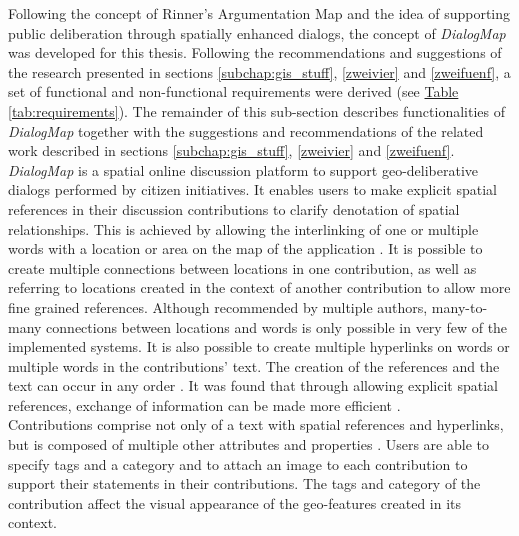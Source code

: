 Following the concept of Rinner's Argumentation Map \cite{Rinner_ArgumentationMaps} and the idea of supporting public deliberation through spatially enhanced dialogs, the concept of \textit{DialogMap} was developed for this thesis. Following the recommendations and suggestions of the research presented in sections \ref{subchap:gis_stuff}, \ref{zweivier} and \ref{zweifuenf}, a set of functional and non-functional requirements were derived (see \hyperref[tab:requirements]{Table \ref{tab:requirements}}). The remainder of this sub-section describes functionalities of \textit{DialogMap} together with the suggestions and recommendations of the related work described in sections \ref{subchap:gis_stuff}, \ref{zweivier} and \ref{zweifuenf}.\\
\textit{DialogMap} is a spatial online discussion platform to support geo-deliberative dialogs \cite{Cai2009_spatial_annotation_deliberation} performed by citizen initiatives. It enables users to make explicit spatial references in their discussion contributions to clarify denotation of spatial relationships. This is achieved by allowing the interlinking of one or multiple words with a location or area on the map of the application \cite{Rinner_ArgumentationMaps}. It is possible to create multiple connections between locations in one contribution, as well as referring to locations created in the context of another contribution to allow more fine grained references. Although recommended by multiple authors, many-to-many connections between locations and words is only possible in very few \cite{Kessler2005_ArgumentationMapPrototype,Voss2004_Evolution_PGIS,you2009_participatory_map_based,Cai2009_spatial_annotation_deliberation} of the implemented systems. It is also possible to create multiple hyperlinks on words or multiple words in the contributions' text. The creation of the references and the text can occur in any order \cite{Voss2004_Evolution_PGIS}. It was found that through allowing explicit spatial references, exchange of information can be made more efficient \cite{Cherubini2007_shared_maps}.\\
Contributions comprise not only of a text with spatial references and hyperlinks, but is composed of multiple other attributes and properties \cite{Longueville2010_community_based_geoportals_web20,Kessler2005_ArgumentationMapPrototype,Kessler2005_Conflict_Resolution}. Users are able to specify tags and a category and to attach an image to each contribution \cite{Tang2005_PPGIS_discussion_forum,zhao2006geodf,you2009_participatory_map_based,Cai2009_spatial_annotation_deliberation} to support their statements in their contributions. The tags and category of the contribution affect the visual appearance of the geo-features created in its context.\\
